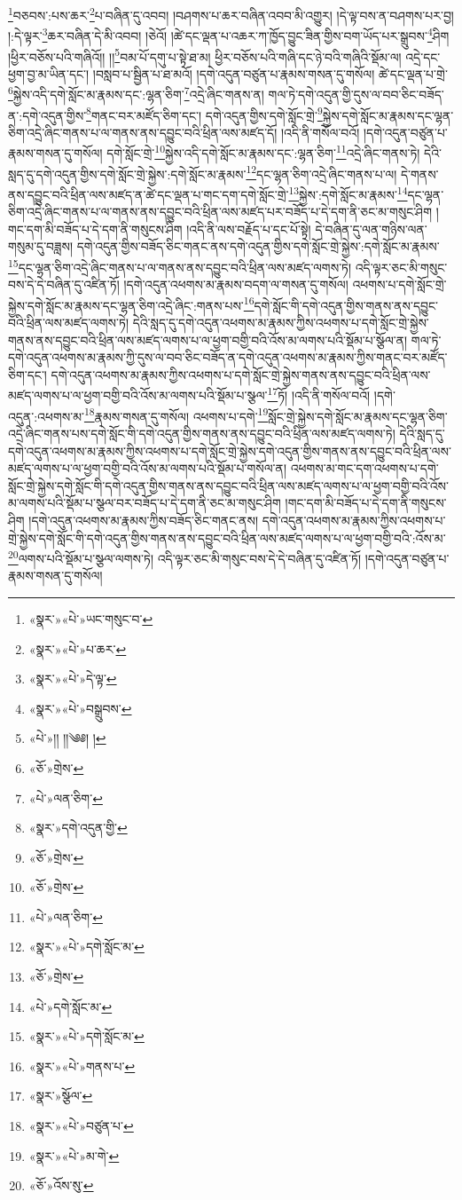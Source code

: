 \footnote{«སྣར་»«པེ་»ཡང་གསུང་བ་}བཅབས་:པས་ཆར་\footnote{«སྣར་»«པེ་»པ་ཆར་}པ་བཞིན་དུ་འབབ། །བཤགས་པ་ཆར་བཞིན་འབབ་མི་འགྱུར། །དེ་ལྟ་བས་ན་བཤགས་པར་བྱ། །:དེ་ལྟར་\footnote{«སྣར་»«པེ་»དེ་ལྟ་}ཆར་བཞིན་དེ་མི་འབབ། །ཅེའོ། །ཚེ་དང་ལྡན་པ་འཆར་ཀ་ཁྱོད་བྱུང་ཟིན་གྱིས་བག་ཡོད་པར་སྒྲུབས་\footnote{«སྣར་»«པེ་»བསྒྲུབས་}ཤིག །ཕྱིར་བཅོས་པའི་གཞིའོ།། །།\footnote{«པེ་»།། །།༄༅། །}བམ་པོ་དགུ་པ་སྟེ་ཐ་མ། ཕྱིར་བཅོས་པའི་གཞི་དང་ཉེ་བའི་གཞིའི་སྡོམ་ལ། འདྲེ་དང་ཕྱག་བྱ་མ་ཡིན་དང་། །བསླབ་པ་སྦྱིན་པ་ཐ་མའོ། །དགེ་འདུན་བཙུན་པ་རྣམས་གསན་དུ་གསོལ། ཚེ་དང་ལྡན་པ་གྲེ་\footnote{«ཅོ་»གྲེས་}སྐྱེས་འདི་དགེ་སློང་མ་རྣམས་དང་:ལྷན་ཅིག་\footnote{«པེ་»ལན་ཅིག་}འདྲེ་ཞིང་གནས་ན། གལ་ཏེ་དགེ་འདུན་གྱི་དུས་ལ་བབ་ཅིང་བཟོད་ན་:དགེ་འདུན་གྱིས་\footnote{«སྣར་»དགེ་འདུན་གྱི་}གནང་བར་མཛོད་ཅིག་དང་། དགེ་འདུན་གྱིས་དགེ་སློང་གྲེ་\footnote{«ཅོ་»གྲེས་}སྐྱེས་དགེ་སློང་མ་རྣམས་དང་ལྷན་ཅིག་འདྲེ་ཞིང་གནས་པ་ལ་གནས་ནས་དབྱུང་བའི་ཕྲིན་ལས་མཛད་དོ། །འདི་ནི་གསོལ་བའོ། །དགེ་འདུན་བཙུན་པ་རྣམས་གསན་དུ་གསོལ། དགེ་སློང་གྲེ་\footnote{«ཅོ་»གྲེས་}སྐྱེས་འདི་དགེ་སློང་མ་རྣམས་དང་:ལྷན་ཅིག་\footnote{«པེ་»ལན་ཅིག་}འདྲེ་ཞིང་གནས་ཏེ། དེའི་སླད་དུ་དགེ་འདུན་གྱིས་དགེ་སློང་གྲེ་སྐྱེས་:དགེ་སློང་མ་རྣམས་\footnote{«སྣར་»«པེ་»དགེ་སློང་མ་}དང་ལྷན་ཅིག་འདྲེ་ཞིང་གནས་པ་ལ། དེ་གནས་ནས་དབྱུང་བའི་ཕྲིན་ལས་མཛད་ན་ཚེ་དང་ལྡན་པ་གང་དག་དགེ་སློང་གྲེ་\footnote{«ཅོ་»གྲེས་}སྐྱེས་:དགེ་སློང་མ་རྣམས་\footnote{«པེ་»དགེ་སློང་མ་}དང་ལྷན་ཅིག་འདྲེ་ཞིང་གནས་པ་ལ་གནས་ནས་དབྱུང་བའི་ཕྲིན་ལས་མཛད་པར་བཟོད་པ་དེ་དག་ནི་ཅང་མ་གསུང་ཤིག །གང་དག་མི་བཟོད་པ་དེ་དག་ནི་གསུངས་ཤིག །འདི་ནི་ལས་བརྗོད་པ་དང་པོ་སྟེ། དེ་བཞིན་དུ་ལན་གཉིས་ལན་གསུམ་དུ་བཟླས། དགེ་འདུན་གྱིས་བཟོད་ཅིང་གནང་ནས་དགེ་འདུན་གྱིས་དགེ་སློང་གྲེ་སྐྱེས་:དགེ་སློང་མ་རྣམས་\footnote{«སྣར་»«པེ་»དགེ་སློང་མ་}དང་ལྷན་ཅིག་འདྲེ་ཞིང་གནས་པ་ལ་གནས་ནས་དབྱུང་བའི་ཕྲིན་ལས་མཛད་ལགས་ཏེ། འདི་ལྟར་ཅང་མི་གསུང་བས་དེ་དེ་བཞིན་དུ་འཛིན་ཏོ། །དགེ་འདུན་འཕགས་མ་རྣམས་བདག་ལ་གསན་དུ་གསོལ། འཕགས་པ་དགེ་སློང་གྲེ་སྐྱེས་དགེ་སློང་མ་རྣམས་དང་ལྷན་ཅིག་འདྲེ་ཞིང་:གནས་པས་\footnote{«སྣར་»«པེ་»གནས་པ་}དགེ་སློང་གི་དགེ་འདུན་གྱིས་གནས་ནས་དབྱུང་བའི་ཕྲིན་ལས་མཛད་ལགས་ཏེ། དེའི་སླད་དུ་དགེ་འདུན་འཕགས་མ་རྣམས་ཀྱིས་འཕགས་པ་དགེ་སློང་གྲེ་སྐྱེས་གནས་ནས་དབྱུང་བའི་ཕྲིན་ལས་མཛད་ལགས་པ་ལ་ཕྱག་བགྱི་བའི་འོས་མ་ལགས་པའི་སྡོམ་པ་སྩོལ་ན། གལ་ཏེ་དགེ་འདུན་འཕགས་མ་རྣམས་ཀྱི་དུས་ལ་བབ་ཅིང་བཟོད་ན་དགེ་འདུན་འཕགས་མ་རྣམས་ཀྱིས་གནང་བར་མཛོད་ཅིག་དང་། དགེ་འདུན་འཕགས་མ་རྣམས་ཀྱིས་འཕགས་པ་དགེ་སློང་གྲེ་སྐྱེས་གནས་ནས་དབྱུང་བའི་ཕྲིན་ལས་མཛད་ལགས་པ་ལ་ཕྱག་བགྱི་བའི་འོས་མ་ལགས་པའི་སྡོམ་པ་སྩལ་\footnote{«སྣར་»སྩོལ་}ཏོ། །འདི་ནི་གསོལ་བའོ། །དགེ་འདུན་:འཕགས་མ་\footnote{«སྣར་»«པེ་»བཙུན་པ་}རྣམས་གསན་དུ་གསོལ། འཕགས་པ་དགེ་\footnote{«སྣར་»«པེ་»མ་གེ་}སློང་གྲེ་སྐྱེས་དགེ་སློང་མ་རྣམས་དང་ལྷན་ཅིག་འདྲེ་ཞིང་གནས་པས་དགེ་སློང་གི་དགེ་འདུན་གྱིས་གནས་ནས་དབྱུང་བའི་ཕྲིན་ལས་མཛད་ལགས་ཏེ། དེའི་སླད་དུ་དགེ་འདུན་འཕགས་མ་རྣམས་ཀྱིས་འཕགས་པ་དགེ་སློང་གྲེ་སྐྱེས་དགེ་འདུན་གྱིས་གནས་ནས་དབྱུང་བའི་ཕྲིན་ལས་མཛད་ལགས་པ་ལ་ཕྱག་བགྱི་བའི་འོས་མ་ལགས་པའི་སྡོམ་པ་གསོལ་ན། འཕགས་མ་གང་དག་འཕགས་པ་དགེ་སློང་གྲེ་སྐྱེས་དགེ་སློང་གི་དགེ་འདུན་གྱིས་གནས་ནས་དབྱུང་བའི་ཕྲིན་ལས་མཛད་ལགས་པ་ལ་ཕྱག་བགྱི་བའི་འོས་མ་ལགས་པའི་སྡོམ་པ་སྩལ་བར་བཟོད་པ་དེ་དག་ནི་ཅང་མ་གསུང་ཤིག །གང་དག་མི་བཟོད་པ་དེ་དག་ནི་གསུངས་ཤིག །དགེ་འདུན་འཕགས་མ་རྣམས་ཀྱིས་བཟོད་ཅིང་གནང་ནས། དགེ་འདུན་འཕགས་མ་རྣམས་ཀྱིས་འཕགས་པ་གྲེ་སྐྱེས་དགེ་སློང་གི་དགེ་འདུན་གྱིས་གནས་ནས་དབྱུང་བའི་ཕྲིན་ལས་མཛད་ལགས་པ་ལ་ཕྱག་བགྱི་བའི་:འོས་མ་\footnote{«ཅོ་»འོས་སུ་}ལགས་པའི་སྡོམ་པ་སྩལ་ལགས་ཏེ། འདི་ལྟར་ཅང་མི་གསུང་བས་དེ་དེ་བཞིན་དུ་འཛིན་ཏོ། །དགེ་འདུན་བཙུན་པ་རྣམས་གསན་དུ་གསོལ། 